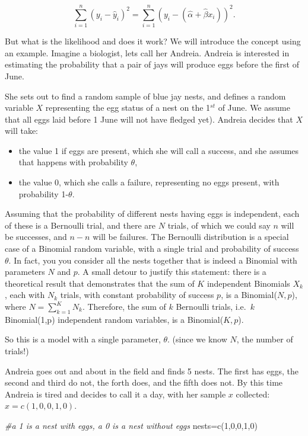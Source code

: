 \documentclass[
]{book}
\newenvironment{Shaded}{\begin{snugshade}}{\end{snugshade}}
\newcommand{\CommentTok}[1]{\textcolor[rgb]{0.56,0.35,0.01}{\textit{#1}}}
\newcommand{\DecValTok}[1]{\textcolor[rgb]{0.00,0.00,0.81}{#1}}
\newcommand{\FunctionTok}[1]{\textcolor[rgb]{0.00,0.00,0.00}{#1}}
\newcommand{\NormalTok}[1]{#1}
\newcommand{\OtherTok}[1]{\textcolor[rgb]{0.56,0.35,0.01}{#1}}
\providecommand{\tightlist}{%
  \setlength{\itemsep}{0pt}\setlength{\parskip}{0pt}}
\begin{document}
\[\sum_{i=1}^n (y_i-\hat y_i)^2=\sum_{i=1}^n (y_i-(\hat \alpha+ \hat \beta x_i))^2.\]

But what is the likelihood and does it work? We will introduce the concept using an example. Imagine a biologist, lets call her Andreia. Andreia is interested in estimating the probability that a pair of jays will produce eggs before the first of June.

She sets out to find a random sample of blue jay nests, and defines a random variable \(X\) representing the egg status of a nest on the 1\(^{st}\) of June. We assume that all eggs laid before 1 June will not have fledged yet). Andreia decides that \(X\) will take:

\begin{itemize}
\tightlist
\item
  the value 1 if eggs are present, which she will call a success, and she assumes that happens with probability \(\theta\),
\item
  the value 0, which she calls a failure, representing no eggs present, with probability 1-\(\theta\).
\end{itemize}

Assuming that the probability of different nests having eggs is independent, each of these is a Bernoulli trial, and there are \(N\) trials, of which we could say \(n\) will be successes, and \(n-n\) will be failures. The Bernoulli distribution is a special case of a Binomial random variable, with a single trial and probability of success \(\theta\). In fact, you you consider all the nests together that is indeed a Binomial with parameters \(N\) and \(p\). A small detour to justify this statement: there is a theoretical result that demonstrates that the sum of \(K\) independent Binomials \(X_k\), each with \(N_k\) trials, with constant probability of success \(p\), is a Binomial(\(N,p\)), where \(N=\sum_{k=1}^K N_k\). Therefore, the sum of \(k\) Bernoulli trials, i.e.~\(k\) Binomial(1,p) independent random variables, is a Binomial(\(K,p\)).

So this is a model with a single parameter, \(\theta\). (since we know \(N\), the number of trials!)

Andreia goes out and about in the field and finds 5 nests. The first has eggs, the second and third do not, the forth does, and the fifth does not. By this time Andreia is tired and decides to call it a day, with her sample \(x\) collected: \(x=c(1,0,0,1,0)\).

\begin{Shaded}
\begin{Highlighting}[]
\CommentTok{\#a 1 is a nest with eggs, a 0 is a nest without eggs}
\NormalTok{nests}\OtherTok{=}\FunctionTok{c}\NormalTok{(}\DecValTok{1}\NormalTok{,}\DecValTok{0}\NormalTok{,}\DecValTok{0}\NormalTok{,}\DecValTok{1}\NormalTok{,}\DecValTok{0}\NormalTok{)}
\end{Highlighting}
\end{Shaded}
\end{document}
